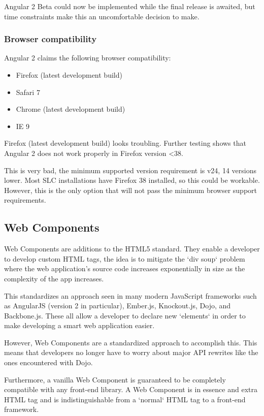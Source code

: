 Angular 2 Beta could now be implemented while the final release is awaited, but time
constraints make this an uncomfortable decision to make.

\subsubsection{Browser compatibility}
Angular 2 claims the following browser compatibility:
\begin{itemize}[noitemsep]
\item Firefox (latest development build)
\item Safari 7
\item Chrome (latest development build)
\item IE 9
\end{itemize}
Firefox (latest development build) looks troubling. Further testing shows that
Angular 2 does not work properly in Firefox version <38.

This is very bad, the minimum supported version requirement is v24, 14 versions
lower. Most SLC installations have Firefox 38 installed, so this could be
workable. However, this is the only option that will not pass the minimum
browser support requirements.

\subsection{Web Components}
Web Components\cite{WebComponentsW3C}\cite{WebcomponentsMozilla} are additions to the HTML5 standard. They
enable a developer to develop custom HTML tags, the idea is to mitigate the
`div soup` problem\cite{DivSoup} where the web application's source code increases
exponentially in size as the complexity of the app increases.

This standardizes an approach seen in many modern JavaScript frameworks such as
AngularJS (version 2 in particular), Ember.js, Knockout.js, Dojo, and Backbone.js.
These all allow a developer to declare new `elements` in order to make developing a
smart web application easier.

However, Web Components are a standardized approach to accomplish this. This
means that developers no longer have to worry about major API rewrites like the ones encountered
with Dojo.

Furthermore, a vanilla Web Component is guaranteed to be completely compatible
with any front-end library. A Web Component is in essence and extra HTML tag
and is indistinguishable from a `normal` HTML tag to a front-end framework.


